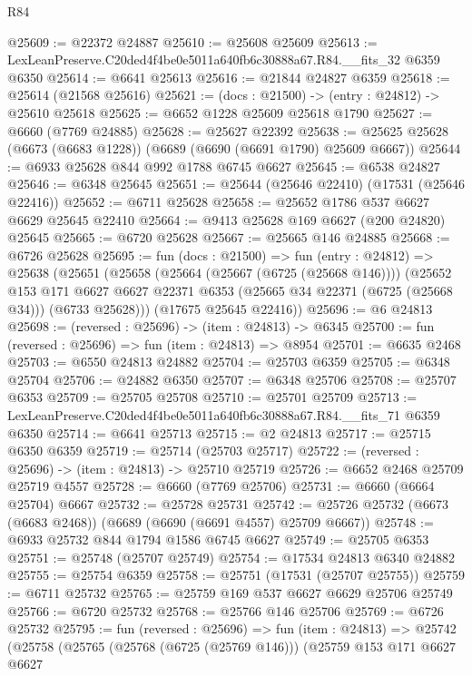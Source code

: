 \begin{lexlean}{R84}
\begin{coremodule}
@25609 := @22372 @24887
@25610 := @25608 @25609
@25613 := LexLeanPreserve.C20ded4f4be0e5011a640fb6c30888a67.R84.__fits_32 @6359 @6350
@25614 := @6641 @25613
@25616 := @21844 @24827 @6359
@25618 := @25614 (@21568 @25616)
@25621 := (docs : @21500) -> (entry : @24812) -> @25610 @25618
@25625 := @6652 @1228 @25609 @25618 @1790
@25627 := @6660 (@7769 @24885)
@25628 := @25627 @22392
@25638 := @25625 @25628 (@6673 (@6683 @1228)) (@6689 (@6690 (@6691 @1790) @25609 @6667))
@25644 := @6933 @25628 @844 @992 @1788 @6745 @6627
@25645 := @6538 @24827
@25646 := @6348 @25645
@25651 := @25644 (@25646 @22410) (@17531 (@25646 @22416))
@25652 := @6711 @25628
@25658 := @25652 @1786 @537 @6627 @6629 @25645 @22410
@25664 := @9413 @25628 @169 @6627 (@200 @24820) @25645
@25665 := @6720 @25628
@25667 := @25665 @146 @24885
@25668 := @6726 @25628
@25695 := fun (docs : @21500) =>
  fun (entry : @24812) =>
  @25638
    (@25651
      (@25658
        (@25664 (@25667 (@6725 (@25668 @146))))
        (@25652
          @153
          @171
          @6627
          @6627
          @22371
          @6353
          (@25665 @34 @22371 (@6725 (@25668 @34)))
          (@6733 @25628)))
      (@17675 @25645 @22416))
@25696 := @6 @24813
@25698 := (reversed : @25696) -> (item : @24813) -> @6345
@25700 := fun (reversed : @25696) => fun (item : @24813) => @8954
@25701 := @6635 @2468
@25703 := @6550 @24813 @24882
@25704 := @25703 @6359
@25705 := @6348 @25704
@25706 := @24882 @6350
@25707 := @6348 @25706
@25708 := @25707 @6353
@25709 := @25705 @25708
@25710 := @25701 @25709
@25713 := LexLeanPreserve.C20ded4f4be0e5011a640fb6c30888a67.R84.__fits_71 @6359 @6350
@25714 := @6641 @25713
@25715 := @2 @24813
@25717 := @25715 @6350 @6359
@25719 := @25714 (@25703 @25717)
@25722 := (reversed : @25696) -> (item : @24813) -> @25710 @25719
@25726 := @6652 @2468 @25709 @25719 @4557
@25728 := @6660 (@7769 @25706)
@25731 := @6660 (@6664 @25704) @6667
@25732 := @25728 @25731
@25742 := @25726 @25732 (@6673 (@6683 @2468)) (@6689 (@6690 (@6691 @4557) @25709 @6667))
@25748 := @6933 @25732 @844 @1794 @1586 @6745 @6627
@25749 := @25705 @6353
@25751 := @25748 (@25707 @25749)
@25754 := @17534 @24813 @6340 @24882
@25755 := @25754 @6359
@25758 := @25751 (@17531 (@25707 @25755))
@25759 := @6711 @25732
@25765 := @25759 @169 @537 @6627 @6629 @25706 @25749
@25766 := @6720 @25732
@25768 := @25766 @146 @25706
@25769 := @6726 @25732
@25795 := fun (reversed : @25696) =>
  fun (item : @24813) =>
  @25742
    (@25758
      (@25765
        (@25768 (@6725 (@25769 @146)))
        (@25759
          @153
          @171
          @6627
          @6627

\end{coremodule}
\end{lexlean}

